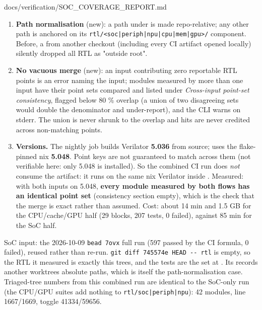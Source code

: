\begin{relocated}{docs/verification/SOC_COVERAGE_REPORT.md}
\begin{enumerate}
  root the run used (a developer worktree such as
  ,  on
  CI,  from ).
\item
  \textbf{Path normalisation} (new): a path under  is made
  repo-relative; any other path is anchored on its
  \texttt{rtl/\allowbreak{}<soc|periph|npu|cpu|mem|gpu>/\allowbreak{}}
  component. Before, a  from another checkout (including
  every CI artifact opened locally) silently dropped all RTL as "outside
  root".
\item
  \textbf{No vacuous merge} (new): an input contributing zero reportable
  RTL points is an error naming the input; modules measured by more than
  one input have their point sets compared and listed under
  \emph{Cross-input point-set consistency}, flagged  below
  80 \% overlap (a union of two disagreeing sets would double the
  denominator and under-report), and the CLI warns on stderr. The union
  is never shrunk to the overlap and hits are never credited across
  non-matching points.
\item
  \textbf{Versions.} The nightly  job builds
  Verilator \textbf{5.036} from source;  uses the
  flake-pinned nix \textbf{5.048}. Point keys are not guaranteed to
  match across them (not verifiable here: only 5.048 is installed). So
  the combined CI run does \emph{not} consume the
   artifact: it runs 
  on the same nix Verilator inside . Measured:
  with both inputs on 5.048, \textbf{every module measured by both flows
  has an identical point set} (consistency section empty), which is the
  check that the merge is exact rather than assumed. Cost: about 14 min
  and 1.5 GB for the CPU/\allowbreak{}cache/\allowbreak{}GPU half (29
   blocks, 207 tests, 0 failed), against 85 min for the SoC
  half.
\end{enumerate}

SoC input: the 2026-10-09 \texttt{bead\ 7ovx} full 
run (597 passed by the CI formula, 0 failed), reused rather than re-run.
\texttt{git\ diff\ 745574e\ HEAD\ -\allowbreak{}-\allowbreak{}\ rtl} is
empty, so the RTL it measured is exactly this tree\textquotesingle s,
and the tests are the  set at . Its
 records another worktree\textquotesingle s absolute paths,
which is itself the path-normalisation case. Triaged-tree numbers from
this combined run are identical to the SoC-only run (the CPU/GPU suites
add nothing to \texttt{rtl/\allowbreak{}soc|periph|npu}): 42 modules,
line 1667/\allowbreak{}1669, toggle 41334/\allowbreak{}59656.


\end{relocated}
